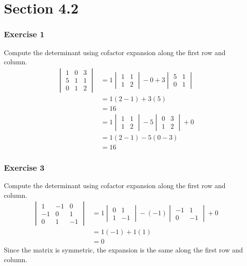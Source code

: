 \documentclass{math}
\begin{document}
\section*{Section 4.2}

\subsubsection*{Exercise 1}
Compute the determinant using cofactor expansion along the first row and column.
\begin{align*}
  \begin{vmatrix}
    1 & 0 & 3 \\
    5 & 1 & 1 \\
    0 & 1 & 2
  \end{vmatrix} &= 1\begin{vmatrix}1 & 1 \\ 1 & 2\end{vmatrix}-
    0+3\begin{vmatrix}5 & 1 \\ 0 & 1\end{vmatrix} \\
  &= 1(2-1)+3(5) \\
  &= 16 \\
  &= 1\begin{vmatrix}1 & 1 \\ 1 & 2\end{vmatrix}-
    5\begin{vmatrix}0 & 3 \\ 1 & 2\end{vmatrix}+0 \\
  &= 1(2-1)-5(0-3) \\
  &= 16
\end{align*}

\subsubsection*{Exercise 3}
Compute the determinant using cofactor expansion along the first row and column.
\begin{align*}
  \begin{vmatrix}
    1 & -1 & 0 \\
    -1 & 0 & 1 \\
    0 & 1 & -1
  \end{vmatrix} &= 1\begin{vmatrix}0 & 1 \\ 1 & -1\end{vmatrix}-
    (-1)\begin{vmatrix}-1 & 1 \\ 0 & -1\end{vmatrix}+0 \\
  &= 1(-1)+1(1) \\
  &= 0
\end{align*}
Since the matrix is symmetric, the expansion is the same along the first row and
column.
\end{document}
